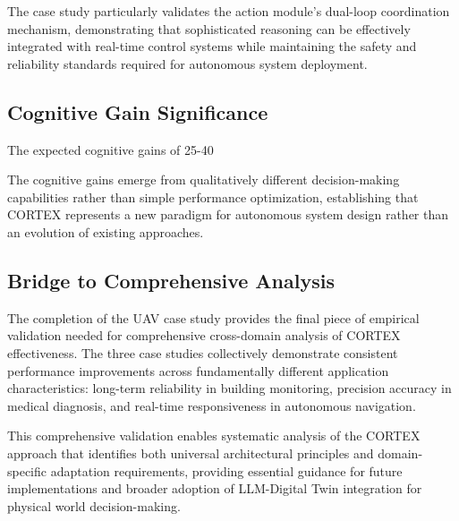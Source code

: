 The case study particularly validates the action module's dual-loop coordination mechanism, demonstrating that sophisticated reasoning can be effectively integrated with real-time control systems while maintaining the safety and reliability standards required for autonomous system deployment.

\subsection{Cognitive Gain Significance}

The expected cognitive gains of 25-40%

The cognitive gains emerge from qualitatively different decision-making capabilities rather than simple performance optimization, establishing that CORTEX represents a new paradigm for autonomous system design rather than an evolution of existing approaches.

\subsection{Bridge to Comprehensive Analysis}

The completion of the UAV case study provides the final piece of empirical validation needed for comprehensive cross-domain analysis of CORTEX effectiveness. The three case studies collectively demonstrate consistent performance improvements across fundamentally different application characteristics: long-term reliability in building monitoring, precision accuracy in medical diagnosis, and real-time responsiveness in autonomous navigation.

This comprehensive validation enables systematic analysis of the CORTEX approach that identifies both universal architectural principles and domain-specific adaptation requirements, providing essential guidance for future implementations and broader adoption of LLM-Digital Twin integration for physical world decision-making.

